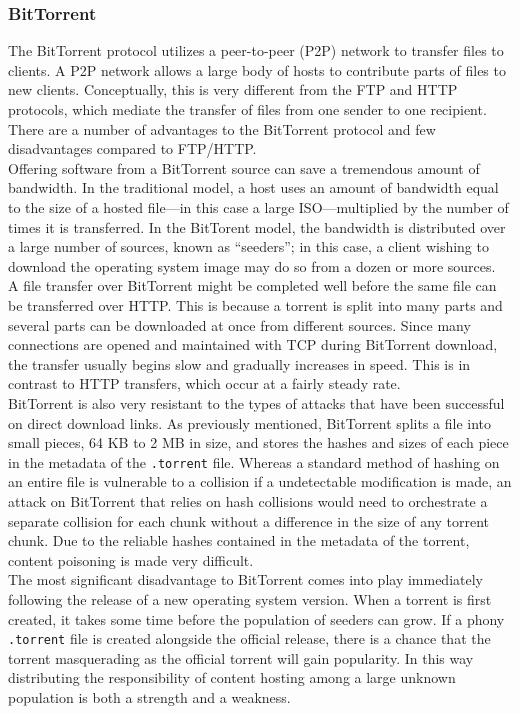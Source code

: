 \documentclass[conference]{IEEEtran}
\begin{document}
\subsubsection{BitTorrent}
The BitTorrent protocol utilizes a peer-to-peer (P2P) network to transfer
files to clients. A P2P network allows a large body of hosts to
contribute parts of files to new clients.
Conceptually, this is very different from the FTP and HTTP protocols,
which mediate the transfer of files from one sender to one recipient.
There are a number of advantages to the BitTorrent protocol and few
disadvantages compared to FTP/HTTP.\\
\indent Offering software from a BitTorrent source can save a tremendous
amount of bandwidth. In the traditional model, a host uses an amount
of bandwidth equal to the size of a hosted file---in this case
a large ISO---multiplied by the number of times it is transferred.
In the BitTorent model,
the bandwidth is distributed over a large number of sources, known as
``seeders''; in this case, a client wishing to download the
operating system image may do so from a dozen or more sources.\\
\indent A file transfer over BitTorrent might be completed well before 
the same file can be transferred over HTTP. This is because a torrent
is split into many parts and several parts can be downloaded at once from
different sources. Since many connections are opened and maintained with 
TCP during BitTorrent download, the transfer usually begins slow
and gradually increases in speed. This is in contrast to HTTP transfers,
which occur at a fairly steady rate.\\
\indent BitTorrent is also very resistant to the types of attacks that
have been successful on direct download links. As previously mentioned,
BitTorrent splits a file into small pieces, 64 KB to 2 MB in size, and
stores the hashes and sizes of each piece in the metadata of
the \texttt{.torrent} file.
Whereas a standard method of hashing on an entire file is vulnerable to
a collision if a undetectable modification is made, an attack on
BitTorrent that relies on hash collisions would need to orchestrate
a separate collision for each chunk without a difference in the size of 
any torrent chunk. Due to the reliable hashes contained in the metadata
of the torrent, content poisoning is made very difficult.\\
\indent The most significant disadvantage to BitTorrent comes into play
immediately following the release of a new operating system version.
When a torrent is first created, it takes some time before the population
of seeders can grow. If a phony \texttt{.torrent} file is created
alongside the official release, there is a chance that the torrent
masquerading as the official torrent will gain popularity. In this way
distributing the responsibility of content hosting among a large unknown
population is both a strength and a weakness.
\end{document}
